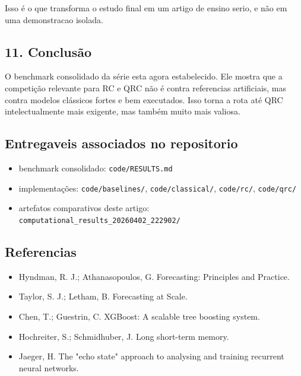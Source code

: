 \documentclass[12pt]{article}
\providecommand{\tightlist}{%
  \setlength{\itemsep}{0pt}\setlength{\parskip}{0pt}}
\begin{document}
Isso é o que transforma o estudo final em um artigo de ensino serio, e não em uma demonstracao isolada.

\subsection{11. Conclusão}\label{11-conclusuxe3o}

O benchmark consolidado da série esta agora estabelecido. Ele mostra que a competição relevante para RC e QRC não é contra referencias artificiais, mas contra modelos clássicos fortes e bem executados. Isso torna a rota até QRC intelectualmente mais exigente, mas também muito mais valiosa.

\subsection{Entregaveis associados no repositorio}\label{entregaveis-associados-no-repositorio}

\begin{itemize}
\tightlist
\item
  benchmark consolidado: \texttt{code/RESULTS.md}
\item
  implementações: \texttt{code/baselines/}, \texttt{code/classical/}, \texttt{code/rc/}, \texttt{code/qrc/}
\item
  artefatos comparativos deste artigo: \texttt{computational\_results\_20260402\_222902/}
\end{itemize}

\subsection{Referencias}\label{referencias}

\begin{itemize}
\tightlist
\item
  Hyndman, R. J.; Athanasopoulos, G. Forecasting: Principles and Practice.
\item
  Taylor, S. J.; Letham, B. Forecasting at Scale.
\item
  Chen, T.; Guestrin, C. XGBoost: A scalable tree boosting system.
\item
  Hochreiter, S.; Schmidhuber, J. Long short-term memory.
\item
  Jaeger, H. The "echo state" approach to analysing and training recurrent neural networks.
\end{itemize}
\end{document}
